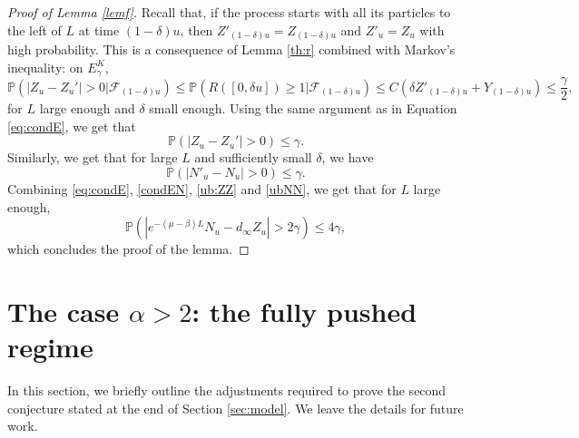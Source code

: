 \documentclass[11pt]{article}
\theoremstyle{plain}
\begin{document}
\begin{proof}[Proof of Lemma \ref{lemf}]
Recall that, if the process starts with all its particles to the left of $L$ at time $(1-\delta)u$, then $Z'_{(1-\delta) u}=Z_{(1-\delta) u}$ and   $Z'_u=Z_u$ with high probability.  This is a consequence of Lemma \ref{th:r} combined with Markov's inequality:  on $E_\gamma^K$,
\begin{equation*}
\mathbb{P}\left(\left|Z_u-Z_u'\right|>0\big|\mathcal{F}_{(1-\delta)u}\right)\leqslant \mathbb{P}\left(R([0,\delta u])\geqslant 1\big|\mathcal{F}_{(1-\delta)u}\right)\leqslant C\left(\delta Z'_{(1-\delta)u}+Y_{(1-\delta)u}\right)\leqslant \frac{\gamma}{2},
\end{equation*}
for $L$ large enough and $\delta$ small enough. Using the same argument as in Equation \eqref{eq:condE}, we get that
\begin{equation}
\mathbb{P}\left(\left|Z_u-Z_u'\right|>0\right)\leqslant \gamma.\label{ub:ZZ}
\end{equation}
Similarly, we get that for large $L$ and sufficiently small $\delta$, we have
\begin{equation}
\mathbb{P}\left(\left|N'_u-N_u\right|>0\right)\leqslant \gamma.\label{ubNN}
\end{equation}
Combining \eqref{eq:condE}, \eqref{condEN}, \eqref{ub:ZZ} and \eqref{ubNN}, we get that for  $L$ large enough,\begin{equation*}
\mathbb{P}\left(|e^{-(\mu-\beta)L}N_u-d_\infty  Z_u|>2\gamma\right)\leqslant 4\gamma,
\end{equation*}
which concludes the proof of the lemma. 
\end{proof}

\section{The case $\alpha>2$: the fully pushed regime}

In this section, we briefly outline the adjustments required to prove the second  conjecture stated at the end of Section \ref{sec:model}. We leave the details for future work.
\end{document}

